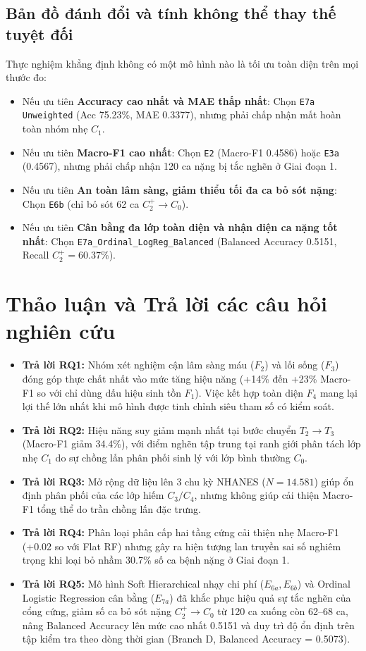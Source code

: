 \subsection{Bản đồ đánh đổi và tính không thể thay thế tuyệt đối}
Thực nghiệm khẳng định không có một mô hình nào là tối ưu toàn diện trên mọi thước đo:
\begin{itemize}
    \item Nếu ưu tiên \textbf{Accuracy cao nhất và MAE thấp nhất}: Chọn \texttt{E7a Unweighted} (Acc 75.23\%, MAE 0.3377), nhưng phải chấp nhận mất hoàn toàn nhóm nhẹ $C_1$.
    \item Nếu ưu tiên \textbf{Macro-F1 cao nhất}: Chọn \texttt{E2} (Macro-F1 0.4586) hoặc \texttt{E3a} (0.4567), nhưng phải chấp nhận 120 ca nặng bị tắc nghẽn ở Giai đoạn 1.
    \item Nếu ưu tiên \textbf{An toàn lâm sàng, giảm thiểu tối đa ca bỏ sót nặng}: Chọn \texttt{E6b} (chỉ bỏ sót 62 ca $C_2^+ \to C_0$).
    \item Nếu ưu tiên \textbf{Cân bằng đa lớp toàn diện và nhận diện ca nặng tốt nhất}: Chọn \texttt{E7a\_Ordinal\_LogReg\_Balanced} (Balanced Accuracy 0.5151, Recall $C_2^+ = 60.37\%$).
\end{itemize}

\section{Thảo luận và Trả lời các câu hỏi nghiên cứu}
\label{sec:thao-luan-rq}

\begin{itemize}
    \item \textbf{Trả lời RQ1:} Nhóm xét nghiệm cận lâm sàng máu ($F_2$) và lối sống ($F_3$) đóng góp thực chất nhất vào mức tăng hiệu năng (+14\% đến +23\% Macro-F1 so với chỉ dùng dấu hiệu sinh tồn $F_1$). Việc kết hợp toàn diện $F_4$ mang lại lợi thế lớn nhất khi mô hình được tinh chỉnh siêu tham số có kiểm soát.
    \item \textbf{Trả lời RQ2:} Hiệu năng suy giảm mạnh nhất tại bước chuyển $T_2 \to T_3$ (Macro-F1 giảm 34.4\%), với điểm nghẽn tập trung tại ranh giới phân tách lớp nhẹ $C_1$ do sự chồng lấn phân phối sinh lý với lớp bình thường $C_0$.
    \item \textbf{Trả lời RQ3:} Mở rộng dữ liệu lên 3 chu kỳ NHANES ($N = 14.581$) giúp ổn định phân phối của các lớp hiếm $C_3/C_4$, nhưng không giúp cải thiện Macro-F1 tổng thể do trần chồng lấn đặc trưng.
    \item \textbf{Trả lời RQ4:} Phân loại phân cấp hai tầng cứng cải thiện nhẹ Macro-F1 (+0.02 so với Flat RF) nhưng gây ra hiện tượng lan truyền sai số nghiêm trọng khi loại bỏ nhầm 30.7\% số ca bệnh nặng ở Giai đoạn 1.
    \item \textbf{Trả lời RQ5:} Mô hình Soft Hierarchical nhạy chi phí ($E_{6a}, E_{6b}$) và Ordinal Logistic Regression cân bằng ($E_{7a}$) đã khắc phục hiệu quả sự tắc nghẽn của cổng cứng, giảm số ca bỏ sót nặng $C_2^+ \to C_0$ từ 120 ca xuống còn 62--68 ca, nâng Balanced Accuracy lên mức cao nhất 0.5151 và duy trì độ ổn định trên tập kiểm tra theo dòng thời gian (Branch D, Balanced Accuracy = 0.5073).
\end{itemize}
\cleardoublepage
